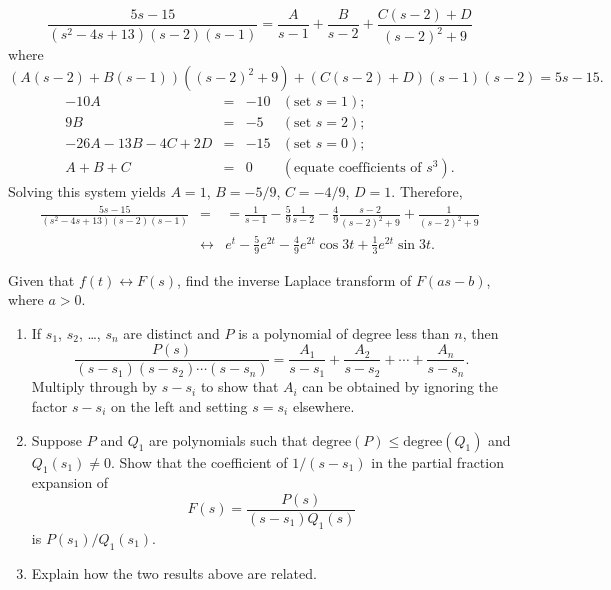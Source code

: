 \documentclass{ximera}
\begin{document}
\begin{problem}
\begin{enumerate}
\begin{solution}
$$
\frac{5s-15}{(s^2-4s+13)(s-2)(s-1)}
=\frac{A}{s-1}+\frac{B}{s-2}+\frac{C(s-2)+D}{(s-2)^2+9}
$$
where
$$
(A(s-2)+B(s-1))((s-2)^2+9)+(C(s-2)+D)(s-1)(s-2)=5s-15.
$$
$$
\begin{array}{rcrl}
-10A&=&-10&(\mbox{set }s=1);\\
9B&=&-5& (\mbox{set }s=2);\\
-26A-13B-4C+2D&=&-15& (\mbox{set }s=0);\\
A+B+C&=&0&(\mbox{equate coefficients of }s^3).
\end{array}
$$
Solving this system yields $A=1$, $B=-5/9$,
$C=-4/9$, $D=1$. Therefore,
\begin{eqnarray*}
\frac{5s-15}{(s^2-4s+13)(s-2)(s-1)}
&=&
=\frac{1}{s-1}-\frac{5}{9}\frac{1}{s-2}-\frac{4}{9}\frac{s-2}{(s-2)^2+9}
+\frac{1}{(s-2)^2+9}
\\&\leftrightarrow&
e^t-\frac{5}{9}e^{2t}-\frac{4}{9}e^{2t}\cos 3t+\frac{1}{3}e^{2t}\sin 3t.
\end{eqnarray*}
\end{solution}

\end{enumerate}
\end{problem}

\begin{problem}\label{exer:8.2.9}
 Given that $f(t)\leftrightarrow F(s)$, find the inverse
Laplace transform of $F(as-b)$, where $a>0$.
\end{problem}

\begin{problem}\label{exer:8.2.10}
\begin{enumerate}
\item  %
If $s_1$, $s_2$, \dots, $s_n$ are distinct and $P$ is a polynomial of
degree less than $n$, then
$$
\frac{P(s)}{(s-s_1)(s-s_2)\cdots(s-s_n)}=
\frac{A_1}{s-s_1}+\frac{A_2}{s-s_2}+\cdots+\frac{A_n}{s-s_n}.
$$
Multiply through by $s-s_i$ to show that
 $A_i$ can be obtained by ignoring the factor $s-s_i$ on the
left and setting $s=s_i$ elsewhere.
\item %
Suppose $P$ and $Q_1$ are polynomials such that
$\text{degree}(P)\le\text{degree}(Q_1)$ and $Q_1(s_1)\ne0$.
Show that the coefficient of $1/(s-s_1)$ in the partial fraction
expansion of
$$
F(s)=\frac{P(s)}{(s-s_1)Q_1(s)}
$$
is $P(s_1)/Q_1(s_1)$.
\item %
Explain how the two results above are related.
\end{enumerate}
\end{problem}
\end{document}
